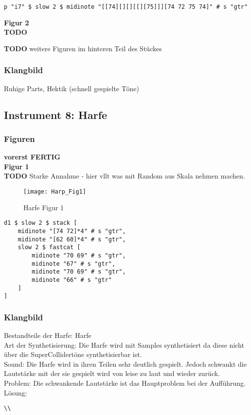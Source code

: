 \documentclass[
10pt, %
a4paper, %
oneside, %
headinclude,footinclude, %
BCOR5mm, %
]{scrartcl}
\begin{document}
\begin{lstlisting}
p "i7" $ slow 2 $ midinote "[[74][][][[][75]]][74 72 75 74]" # s "gtr"
\end{lstlisting}

\noindent\textbf{Figur 2}\\
{\color{red}\textbf{TODO}} 


{\color{red}\textbf{TODO}} weitere Figuren im hinteren Teil des Stückes

\subsubsection{Klangbild}
Ruhige Parts, Hektik (schnell gespielte Töne)


\subsection{Instrument 8: Harfe}
\subsubsection{Figuren}
{\color{green}\textbf{vorerst FERTIG}} \\
\noindent\textbf{Figur 1}\\
{\color{red}\textbf{TODO}} Starke Annahme - hier vllt was mit Random aus Skala nehmen machen.
\begin{figure}[h]
	\centering 
	\texttt{[image: Harp\_Fig1]} 
	\caption{Harfe Figur 1}
\end{figure}

\begin{lstlisting}
d1 $ slow 2 $ stack [
	midinote "[74 72]*4" # s "gtr", 
	midinote "[62 60]*4" # s "gtr", 
	slow 2 $ fastcat [
		midinote "70 69" # s "gtr", 
		midinote "67" # s "gtr",
		midinote "70 69" # s "gtr", 
		midinote "66" # s "gtr"    
	]
]
\end{lstlisting}



\subsubsection{Klangbild}
Bestandteile der Harfe: Harfe\\
Art der Synthetisierung: Die Harfe wird mit Samples synthetisiert da diese nicht über die SuperCollidertöne synthetisierbar ist.\\
Sound: Die Harfe wird in ihren Teilen sehr deutlich gespielt. Jedoch schwankt die Lautstärke mit der sie gespielt wird von leise zu laut und wieder zurück.\\
Problem: Die schwankende Lautstärke ist das Hauptproblem bei der Aufführung.\\
Lösung:\\
\begin{lstlisting}
\\
\end{lstlisting}
\end{document}
